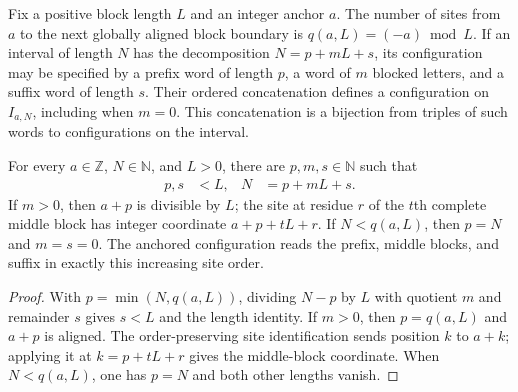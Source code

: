 \begin{definition}
    \label{def:mpu_anchored_residual_configurations}
    \leanok
    Fix a positive block length $L$ and an integer anchor $a$. The number
    of sites from $a$ to the next globally aligned block boundary is
    $q(a,L)=(-a)\bmod L$. If an interval of length $N$ has the decomposition
    $N=p+mL+s$, its configuration may be specified by a prefix word of
    length $p$, a word of $m$ blocked letters, and a suffix word of length
    $s$. Their ordered concatenation defines a configuration on
    $I_{a,N}$, including when $m=0$. This concatenation is a bijection
    from triples of such words to configurations on the interval.
\end{definition}

\begin{lemma}
    \label{thm:mpu_anchored_residual_decomposition}
    \leanok
    For every $a\in\mathbb Z$, $N\in\mathbb N$, and $L>0$, there are
    $p,m,s\in\mathbb N$ such that
    \begin{align}
        p,s & <L, & N & =p+mL+s.
    \end{align}
    If $m>0$, then $a+p$ is divisible by $L$; the site at residue $r$ of
    the $t$th complete middle block has integer coordinate
    $a+p+tL+r$. If $N<q(a,L)$, then $p=N$ and $m=s=0$. The anchored
    configuration reads the prefix, middle blocks, and suffix in exactly
    this increasing site order.
\end{lemma}

\begin{proof}\leanok
    With $p=\min(N,q(a,L))$, dividing $N-p$ by $L$ with quotient
    $m$ and remainder $s$ gives $s<L$ and the
    length identity. If $m>0$, then $p=q(a,L)$ and $a+p$ is aligned.
    The order-preserving site identification sends position $k$ to $a+k$;
    applying it at $k=p+tL+r$ gives the middle-block coordinate. When
    $N<q(a,L)$, one has $p=N$ and both other lengths vanish.
\end{proof}

